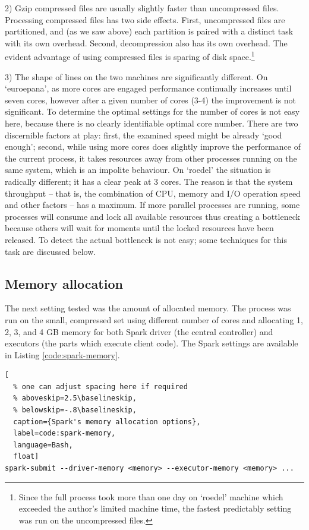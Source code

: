 2) Gzip compressed files are usually slightly faster than uncompressed files. Processing compressed files has two side effects. First, uncompressed files are partitioned, and (as we saw above) each partition is paired with a distinct task with its own overhead. Second, decompression also has its own overhead. The evident advantage of using compressed files is sparing of disk space.\footnote{Since the full process took more than one day on `roedel' machine which exceeded the author's limited machine time, the fastest predictably setting was run on the uncompressed files.}

3) The shape of lines on the two machines are significantly different. On `euroepana', as more cores are engaged performance continually increases until seven cores, however after a given number of cores (3-4) the improvement is not significant. To determine the optimal settings for the number of cores is not easy here, because there is no clearly identifiable optimal core number. There are two discernible factors at play: first, the examined speed might be already `good enough'; second, while using more cores does slightly improve the performance of the current process, it takes resources away from other processes running on the same system, which is an impolite behaviour. On `roedel' the situation is radically different; it has a clear peak at 3 cores. The reason is that the system throughput -- that is, the combination of CPU, memory and I/O operation speed and other factors -- has a maximum. If more parallel processes are running, some processes will consume and lock all available resources thus creating a bottleneck because others will wait for moments until the locked resources have been released. To detect the actual bottleneck is not easy; some techniques for this task are discussed below.

\subsection{Memory allocation}

The next setting tested was the amount of allocated memory. The process was run on the small, compressed set using different number of cores and allocating 1, 2, 3, and 4 GB memory for both Spark driver (the central controller) and executors (the parts which execute client code). The Spark settings are available in Listing \ref{code:spark-memory}.

\begin{lstlisting}[
  % one can adjust spacing here if required
  % aboveskip=2.5\baselineskip,
  % belowskip=-.8\baselineskip,
  caption={Spark's memory allocation options},
  label=code:spark-memory,
  language=Bash,
  float]
spark-submit --driver-memory <memory> --executor-memory <memory> ...
\end{lstlisting}

